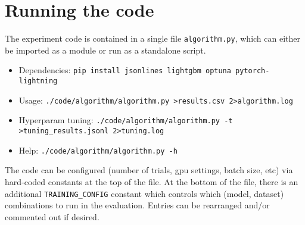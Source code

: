 \documentclass{article} %
\begin{document}
\printbibliography\appendix

\section{Running the code}
The experiment code is contained in a single file \texttt{algorithm.py}, which can either be imported as a module or run as a standalone script.

\begin{itemize}
\item Dependencies: \texttt{pip install jsonlines lightgbm optuna pytorch-lightning}
\item Usage: \texttt{./code/algorithm/algorithm.py >results.csv 2>algorithm.log}
\item Hyperparam tuning: \texttt{./code/algorithm/algorithm.py -t >tuning\_results.jsonl 2>tuning.log}
\item Help: \texttt{./code/algorithm/algorithm.py -h}
\end{itemize}

The code can be configured (number of trials, gpu settings, batch size, etc) via hard-coded constants at the top of the file. At the bottom of the file, there is an additional \texttt{TRAINING\_CONFIG} constant which controls which (model, dataset) combinations to run in the evaluation. Entries can be rearranged and/or commented out if desired.
\end{document}
